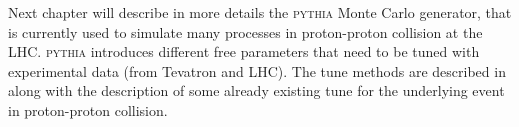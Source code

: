 Next chapter will describe in more details  the \textsc{pythia} Monte Carlo generator, that is currently used to simulate many processes in proton-proton collision at the LHC. \textsc{pythia} introduces different free parameters that need to be tuned with experimental data (from Tevatron and LHC). The tune methods are described in  along with the description of some already existing tune for the underlying event in proton-proton collision.










%